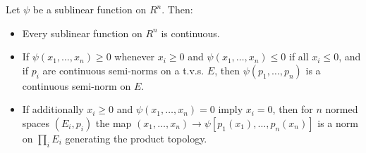 Let $\psi$ be a sublinear function on $R^n$. Then:
\begin{itemize}
\item[(a)] Every sublinear function on $R^n$ is continuous.
\item[(b)] If $\psi(x_1, \ldots, x_n) \geq 0$ whenever $x_i \geq 0$ and $\psi(x_1, \ldots, x_n) \leq 0$ if all $x_i \leq 0$, and if $p_i$ are continuous semi-norms on a t.v.s. $E$, then $\psi(p_1, \ldots, p_n)$ is a continuous semi-norm on $E$.
\item[(c)] If additionally $x_i \geq 0$ and $\psi(x_1, \ldots, x_n) = 0$ imply $x_i = 0$, then for $n$ normed spaces $(E_i, p_i)$ the map $(x_1, \ldots, x_n) \to \psi[p_1(x_1), \ldots, p_n(x_n)]$ is a norm on $\prod_i E_i$ generating the product topology.
\end{itemize}
